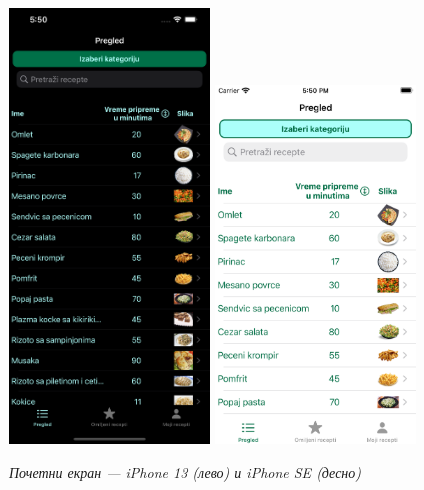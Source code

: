 \documentclass[12pt,oneside]{memoir}
\begin{document}
\begin{figure} [H]
    \centering
    \captionsetup{justification=centering}
    \includegraphics[width=0.475\textwidth]{images/simulators/view images/dark - overview.png} 
    \hfill
    \includegraphics[width=0.475\textwidth]{images/simulators/view images/light - overview.png} 
    \caption{\textit{Почетни екран --- iPhone 13 (лево) и iPhone SE (десно)}}
    \label{slika:почетни_екран_1}
\end{figure}
\end{document}
